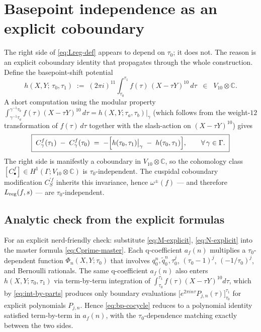\documentclass[11pt,letterpaper]{article}
\newcommand{\CC}{\mathbb{C}}
\begin{document}
\section{Basepoint independence as an explicit coboundary}\label{sec:tau0-indep}

The right side of \eqref{eq:Lreg-def} appears to depend on $\tau_0$; it does
not.  The reason is an explicit coboundary identity that propagates through
the whole construction.  Define the basepoint-shift potential
\begin{equation}\label{eq:bp-h}
  h(X, Y;\,\tau_0, \tau_1)
  \;:=\; (2\pi i)^{11}\!\int_{\tau_0}^{\tau_1}\! f(\tau)\,(X - \tau Y)^{10}\,d\tau
  \;\;\in\;\; V_{10}\otimes\CC.
\end{equation}
A short computation using the modular property
$\int_{\gamma^{-1}\tau_a}^{\gamma^{-1}\tau_b} f(\tau)(X-\tau Y)^{10}\,d\tau =
h(X,Y;\tau_a,\tau_b)\big|_\gamma$ (which follows from the weight-$12$
transformation of $f(\tau)\,d\tau$ together with the slash-action on
$(X-\tau Y)^{10}$) gives
\begin{equation}\label{eq:bp-cocycle}
  \boxed{\;
    C^f_\gamma(\tau_1)\;-\;C^f_\gamma(\tau_0)
    \;=\; -\Bigl[h(\tau_0,\tau_1)\big|_\gamma \;-\; h(\tau_0,\tau_1)\Bigr],
  \qquad \forall\,\gamma\in\Gamma.
  \;}
\end{equation}
The right side is manifestly a coboundary in $V_{10}\otimes\CC$, so the
cohomology class $[C^f_\bullet] \in H^1(\Gamma; V_{10}\otimes\CC)$ is
$\tau_0$-independent.  The cuspidal coboundary modification $C^{\prime f}_S$
inherits this invariance, hence $\omega^\pm(f)$ — and therefore
$L_{\rm reg}(f, s)$ — are $\tau_0$-independent.

\subsection{Analytic check from the explicit formulas}

For an explicit nerd-friendly check: substitute \eqref{eq:M-explicit},
\eqref{eq:N-explicit} into the master formula \eqref{eq:Cprime-master}.
Each q-coefficient $a_f(n)$ multiplies a $\tau_0$-dependent function
$\Phi_n(X,Y;\tau_0)$ that involves $q_0^n, \widetilde q_0^n, \tau_0^j$,
$(\tau_0-1)^j$, $(-1/\tau_0)^j$, and Bernoulli rationals.  The same q-coefficient
$a_f(n)$ also enters $h(X,Y;\tau_0,\tau_1)$ via term-by-term integration of
$\int_{\tau_0}^{\tau_1}\!f(\tau)(X-\tau Y)^{10}d\tau$, which by
\eqref{eq:int-by-parts} produces only boundary evaluations
$\bigl[e^{2\pi i n \tau}P_{j,n}(\tau)\bigr]_{\tau_0}^{\tau_1}$ for explicit
polynomials $P_{j,n}$.  Hence \eqref{eq:bp-cocycle} reduces to a polynomial
identity satisfied term-by-term in $a_f(n)$, with the $\tau_0$-dependence
matching exactly between the two sides.
\end{document}
